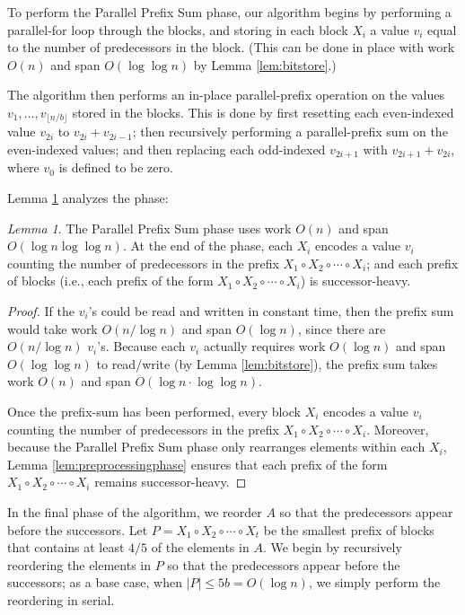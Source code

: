 \documentclass[11pt]{article}
\renewcommand{\paragraph}[1]{\vspace{0.09in}\noindent{\bf \boldmath #1.}}
\theoremstyle{remark}
\newtheorem{lemma}[thm]{Lemma}
\theoremstyle{remark}
\begin{document}
To perform the Parallel Prefix Sum phase, our algorithm begins by
performing a parallel-for loop through the blocks, and storing in each
block $X_i$ a value $v_i$ equal to the number of predecessors in the
block. (This can be done in place with work $O(n)$ and span $O(\log
\log n)$ by Lemma \ref{lem:bitstore}.)

The algorithm then performs an in-place parallel-prefix operation on
the values $v_1, \ldots, v_{\lfloor n / b \rfloor}$ stored in the
blocks. This is done by first resetting each even-indexed value
$v_{2i}$ to $v_{2i} + v_{2i - 1}$; then recursively performing a
parallel-prefix sum on the even-indexed values; and then replacing
each odd-indexed $v_{2i + 1}$ with $v_{2i + 1} + v_{2i}$, where $v_0$
is defined to be zero.

Lemma \ref{lem:parallelprefix} analyzes the phase:
\begin{lemma}
  The Parallel Prefix Sum phase uses work $O(n)$ and span
  $O(\log n \log \log n)$. At the end of the phase, each $X_i$ encodes
  a value $v_i$ counting the number of predecessors in the prefix
  $X_1 \circ X_2 \circ \cdots \circ X_i$; and each prefix of blocks
  (i.e., each prefix of the form
  $X_1 \circ X_2 \circ \cdots \circ X_i$) is successor-heavy.
\label{lem:parallelprefix}
\end{lemma}
\begin{proof}
If the $v_i$'s could be read and written in constant time, then the
prefix sum would take work $O(n / \log n)$ and span $O(\log n)$, since
there are $O(n / \log n)$ $v_i$'s. Because each $v_i$ actually
requires work $O(\log n)$ and span $O(\log \log n)$ to read/write (by
Lemma \ref{lem:bitstore}), the prefix sum takes work $O(n)$ and span
$O(\log n \cdot \log \log n)$.

Once the prefix-sum has been performed, every block $X_i$
encodes a value $v_i$ counting the number of predecessors in the
prefix $X_1 \circ X_2 \circ \cdots \circ X_i$. Moreover, because the
Parallel Prefix Sum phase only rearranges elements within each $X_i$,
Lemma \ref{lem:preprocessingphase} ensures that each prefix of the
form $X_1 \circ X_2 \circ \cdots \circ X_i$ remains successor-heavy.
\end{proof}

\paragraph{In-Place Reordering}
In the final phase of the algorithm, we reorder $A$ so that the
predecessors appear before the successors. Let $P = X_1 \circ X_2
\circ \cdots \circ X_t$ be the smallest prefix of blocks that contains
at least $4/5$ of the elements in $A$. We begin by recursively
reordering the elements in $P$ so that the predecessors appear before
the successors; as a base case, when $|P| \le 5b = O(\log n)$, we
simply perform the reordering in serial.
\end{document}
